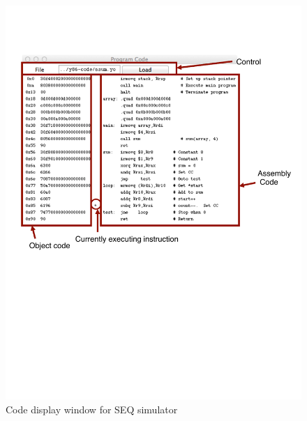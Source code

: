 \documentclass[11pt]{article}
\begin{document}
\begin{figure}
\centerline{\includegraphics*[scale=1.0]{seq-code}}
\caption{Code display window for SEQ simulator}
\label{fig:sim:seq-code}
\end{figure}
\end{document}
